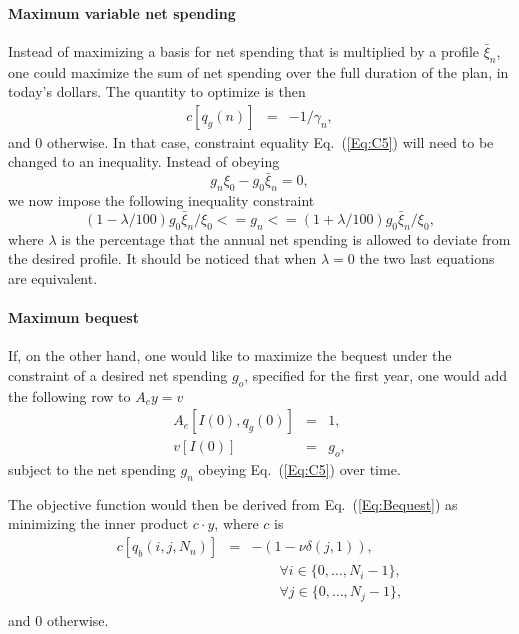 \documentclass{report}[fleqn,11pt]
\begin{document}
\paragraph*{Maximum variable net spending}
Instead of maximizing a basis for net spending that is multiplied by a profile $\bar{\xi}_n$,
one could maximize the sum of net spending over the full duration
of the plan, in today's dollars. The quantity to optimize is then
\begin{eqnarray}
	c[q_g(n)] &=& -1/\gamma_n,
\end{eqnarray}
and 0 otherwise.
In that case, constraint equality Eq.~(\ref{Eq:C5}) will need to be changed to an inequality. 
Instead of obeying 
\begin{equation}
	g_n \xi_0 - g_0 \bar{\xi}_n = 0,
\end{equation}
we now impose the following inequality constraint
\begin{equation}
        \label{Eq:C15}
	(1 - \lambda/100) g_0 \bar{\xi}_n/\xi_0 <= g_n <= (1 + \lambda/100) g_0 \bar{\xi}_n/\xi_0 ,
\end{equation}
where $\lambda$ is the percentage that the annual net spending is allowed to deviate
from the desired profile. It should be noticed that when $\lambda = 0$ the two
last equations are equivalent.

\paragraph*{Maximum bequest}
If, on the other hand, one would like to maximize the bequest under the constraint of a desired
net spending $g_o$, specified for the first year,
one would add the following row to $A_ey = v$
\begin{eqnarray}
	\label{Eq:FixedIncome}
	A_e[I(0), q_g(0)] &=& 1, \nonumber \\
	v[I(0)] &=& g_o,
\end{eqnarray}
subject to the net spending $g_n$ obeying Eq.~(\ref{Eq:C5}) over time.

The objective function would then be derived from Eq.~(\ref{Eq:Bequest}) as
minimizing the inner product $c\cdot y$, where $c$ is
\begin{eqnarray}
	\label{Eq:MaxBequest}
	c[q_b(i, j, N_n)] &=& -(1 - \nu\delta(j, 1)),\\
	&&\qquad\forall i \in \{0,\ldots, N_i-1\},\nonumber\\
	&&\qquad\forall j \in \{0,\ldots, N_j-1\},\nonumber\\
\end{eqnarray}
and 0 otherwise.
\end{document}
